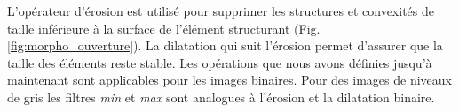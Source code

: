L'opérateur d'érosion est utilisé pour supprimer les structures et convexités de taille inférieure à la surface de l'élément structurant (Fig. \ref{fig:morpho_ouverture}). La dilatation qui suit l'érosion permet d'assurer que la taille des éléments reste stable.
Les opérations que nous avons définies jusqu'à maintenant sont applicables pour les images binaires. Pour des images de niveaux de gris les filtres \emph{min} et \emph{max} sont analogues à l'érosion et la dilatation binaire.

